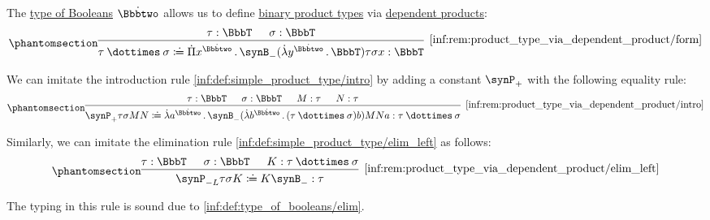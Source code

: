 \begin{remark}\label{rem:product_type_via_dependent_product}
  The \hyperref[def:type_of_booleans]{type of Booleans} \( \syn\Bbbtwo \) allows us to define \hyperref[def:simple_product_type]{binary product types} via \hyperref[def:dependent_product]{dependent products}:
  \begin{equation*}\taglabel[\ensuremath{ \times_{\logic{form}}^{\logic{bin}} }]{inf:rem:product_type_via_dependent_product/form}
    \begin{prooftree}
      \hypo{ \tau: \BbbT }
      \hypo{ \sigma: \BbbT }
      \infer2[\ref{inf:rem:product_type_via_dependent_product/form}]{ \tau \syntimes \sigma \syndefeq \qprod {x^{\syn\Bbbtwo}} \synB_- (\qabs {y^{\syn\Bbbtwo}} \BbbT) \tau \sigma x: \BbbT }
    \end{prooftree}
  \end{equation*}

  We can imitate the introduction rule \ref{inf:def:simple_product_type/intro} by adding a constant \( \synP_+ \) with the following equality rule:
  \begin{equation*}\taglabel[\ensuremath{ \times_+^{\logic{bin}} }]{inf:rem:product_type_via_dependent_product/intro}
    \begin{prooftree}
      \hypo{ \tau: \BbbT }
      \hypo{ \sigma: \BbbT }
      \hypo{ M: \tau }
      \hypo{ N: \tau }
      \infer4[\ref{inf:rem:product_type_via_dependent_product/intro}]{ \synP_+ \tau \sigma M N \syndefeq \qabs {a^{\syn\Bbbtwo}} \synB_- (\qabs {b^{\syn\Bbbtwo}} (\tau \syntimes \sigma) b) M N a: \tau \syntimes \sigma }
    \end{prooftree}
  \end{equation*}

  Similarly, we can imitate the elimination rule \ref{inf:def:simple_product_type/elim_left} as follows:
  \begin{equation*}\taglabel[\ensuremath{ \times_{-L}^{\logic{bin}} }]{inf:rem:product_type_via_dependent_product/elim_left}
    \begin{prooftree}
      \hypo{ \tau: \BbbT }
      \hypo{ \sigma: \BbbT }
      \hypo{ K: \tau \syntimes \sigma }
      \infer3[\ref{inf:rem:product_type_via_dependent_product/elim_left}]{ \synP_{-L} \tau \sigma K \syndefeq K \synB_-: \tau }
    \end{prooftree}
  \end{equation*}

  The typing in this rule is sound due to \ref{inf:def:type_of_booleans/elim}.


\end{remark}
